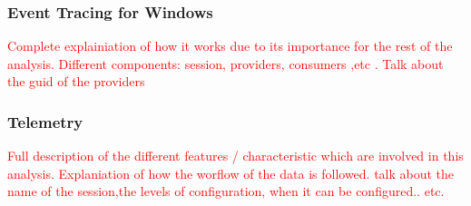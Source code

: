 \subsubsection{Event Tracing for Windows} \label{ETW}
\textcolor{red}{Complete explainiation of how it works due to its importance for the rest of the analysis. Different components: session, providers, consumers ,etc .
Talk about the guid of the providers}
\subsubsection{Telemetry}
\textcolor{red}{Full description of the different features / characteristic which are involved in this analysis. Explaniation of how the worflow of the data is followed.
talk about the name of the session,the levels of configuration, when it can be configured.. etc.}

